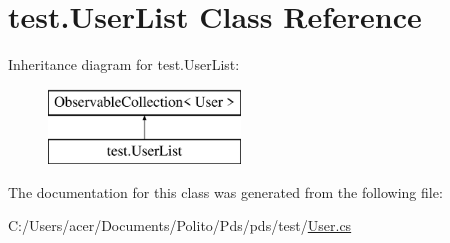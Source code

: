 \hypertarget{classtest_1_1_user_list}{}\section{test.\+User\+List Class Reference}
\label{classtest_1_1_user_list}
Inheritance diagram for test.\+User\+List\+:\begin{figure}[H]
\begin{center}
\leavevmode
\includegraphics[height=2.000000cm]{classtest_1_1_user_list}
\end{center}
\end{figure}


The documentation for this class was generated from the following file\+:\begin{DoxyCompactItemize}
\item 
C\+:/\+Users/acer/\+Documents/\+Polito/\+Pds/pds/test/\hyperlink{_user_8cs}{User.\+cs}\end{DoxyCompactItemize}
